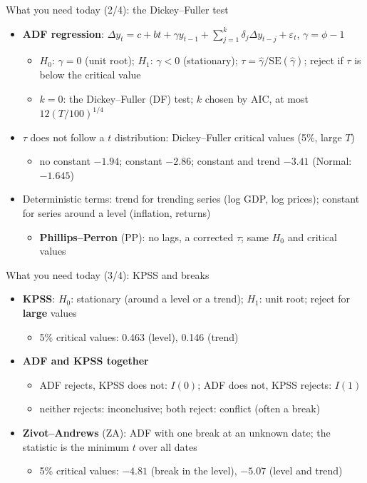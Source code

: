 \begin{frame}{What you need today (2/4): the Dickey--Fuller test}
\itemsize{\small}
\begin{itemize}
    \item \textbf{ADF regression}: $\Delta y_t = c + bt + \gamma y_{t-1} + \sum_{j=1}^{k}\delta_j\Delta y_{t-j} + \varepsilon_t$, $\gamma = \phi - 1$
    \begin{itemize}
        \item $H_0$: $\gamma = 0$ (unit root); $H_1$: $\gamma < 0$ (stationary); $\tau = \hat\gamma/\mathrm{SE}(\hat\gamma)$; reject if $\tau$ is below the critical value
        \item $k = 0$: the Dickey--Fuller (DF) test; $k$ chosen by AIC, at most $12(T/100)^{1/4}$
    \end{itemize}
    \item $\tau$ does not follow a $t$ distribution: Dickey--Fuller critical values (5\%, large $T$)
    \begin{itemize}
        \item no constant $-1.94$; constant $-2.86$; constant and trend $-3.41$ (Normal: $-1.645$)
    \end{itemize}
    \item Deterministic terms: trend for trending series (log GDP, log prices); constant for series around a level (inflation, returns)
    \begin{itemize}
        \item \textbf{Phillips--Perron} (PP): no lags, a corrected $\tau$; same $H_0$ and critical values
    \end{itemize}
\end{itemize}
\end{frame}

\begin{frame}{What you need today (3/4): KPSS and breaks}
\itemsize{\small}
\begin{itemize}
    \item \textbf{KPSS}: $H_0$: stationary (around a level or a trend); $H_1$: unit root; reject for \textbf{large} values
    \begin{itemize}
        \item 5\% critical values: 0.463 (level), 0.146 (trend)
    \end{itemize}
    \item \textbf{ADF and KPSS together}
    \begin{itemize}
        \item ADF rejects, KPSS does not: $I(0)$; ADF does not, KPSS rejects: $I(1)$
        \item neither rejects: inconclusive; both reject: conflict (often a break)
    \end{itemize}
    \item \textbf{Zivot--Andrews} (ZA): ADF with one break at an unknown date; the statistic is the minimum $t$ over all dates
    \begin{itemize}
        \item 5\% critical values: $-4.81$ (break in the level), $-5.07$ (level and trend)
    \end{itemize}
\end{itemize}
\end{frame}

